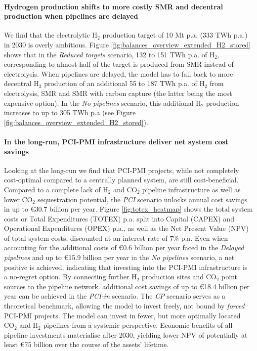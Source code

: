 \documentclass[pdflatex,sn-nature]{sn-jnl}
\theoremstyle{thmstyleone}%
\theoremstyle{thmstyletwo}%
\theoremstyle{thmstylethree}%
\begin{document}
\paragraph{Hydrogen production shifts to more costly SMR and decentral production when pipelines are delayed} 
We find that the electrolytic H$_2$ production target of 10 Mt p.a. (333 TWh p.a.) in 2030 is overly ambitious. Figure \ref{fig:balances_overview_extended_H2_stored} shows that in the \textit{Reduced targets} scenario, 132 to 151 TWh p.a. of H$_2$, corresponding to almost half of the target is produced from SMR instead of electrolysis. When pipelines are delayed, the model has to fall back to more decentral H$_2$ production of an additional 55 to 187 TWh p.a. of H$_2$ from electrolysis, SMR and SMR with carbon capture (the latter being the most expensive option). In the \textit{No pipelines} scenario, this additional H$_2$ production increases to up to 305 TWh p.a (see Figure \ref{fig:balances_overview_extended_H2_stored}).

\paragraph{In the long-run, PCI-PMI infrastructure deliver net system cost savings}
Looking at the long-run we find that PCI-PMI projects, while not completely cost-optimal compared to a centrally planned system, are still cost-beneficial. Compared to a complete lack of H$_2$ and CO$_2$ pipeline infrastructure as well as lower CO$_2$ sequestration potential, the \textit{PCI} scenario unlocks annual cost savings in up to €30.7 billion per year. Figure \ref{fig:totex_heatmap} shows the total system costs or Total Expenditures (TOTEX) p.a. split into Capital (CAPEX) and Operational Expenditures (OPEX) p.a., as well as the Net Present Value (NPV) of total system costs, discounted at an interest rate of 7\% p.a.
Even when accounting for the additional costs of €0.6 billion per year faced in the \textit{Delayed pipelines} and up to €15.9 billion per year in the \textit{No pipelines} scenario, a net positive is achieved, indicating that investing into the PCI-PMI infrastructure is a no-regret option. By connecting further H$_2$ production sites and CO$_2$ point sources to the pipeline network. additional cost savings of up to €18.4 billion per year can be achieved in the \textit{PCI-in} scenario. The \textit{CP} scenario serves as a theoretical benchmark, allowing the model to invest freely, not bound by \textit{forced} PCI-PMI projects. The model can invest in fewer, but more optimally located CO$_2$ and H$_2$ pipelines from a systemic perspective. Economic benefits of all pipeline investments materialise after 2030, yielding lower NPV of potentially at least €75 billion over the course of the assets' lifetime. 
\end{document}
